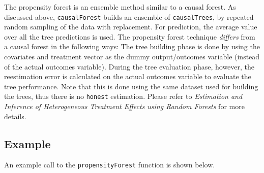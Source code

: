 \documentclass[11pt]{article}
\renewenvironment{Schunk}{\vspace{\topsep}}{\vspace{\topsep}}
\begin{document}
The propensity forest is an ensemble method similar to a causal forest.
As discussed above, \texttt{causalForest} builds an ensemble of \texttt{causalTrees}, by repeated random sampling of the data with replacement. For prediction, the average value over all the tree predictions is used.
The propensity forest technique \textit{differs} from a causal forest in the following ways:
The tree building phase is done by using the covariates and treatment vector as the dummy output/outcomes variable (instead of the actual outcomes variable).
During the tree evaluation phase, however, the reestimation error is calculated on the actual outcomes variable to evaluate the tree performance. Note that this is done using the same dataset used for building the trees, thus there is no \texttt{honest} estimation.
Please refer to \textit{Estimation and Inference of Heterogeneous Treatment Effects using Random Forests} \cite{wager2015forest} for more details.
\subsection{Example}
An example call to the \texttt{propensityForest} function is shown below.

\begin{Schunk}
\end{Schunk}




\end{document}

